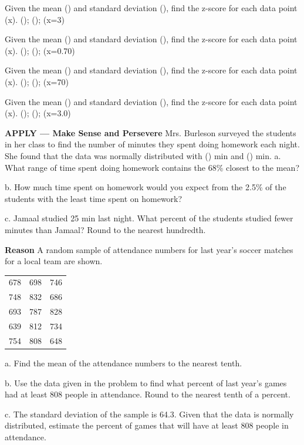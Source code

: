 \documentclass{article}
\newenvironment{practice}[2]{}{}        %
\newcommand{\answer}[1]{}               %
\newcommand{\placeholder}[2]{}          %
\begin{document}
\begin{practice}{25}{1}
Given the mean (\mu) and standard deviation (\sigma), find the z-score for each data point (x).
(); (); (x=3)
\answer{1.5}
\end{practice}
\begin{practice}{26}{1}
Given the mean (\mu) and standard deviation (\sigma), find the z-score for each data point (x).
(); (); (x=0.70)
\answer{−2}
\end{practice}
\begin{practice}{27}{1}
Given the mean (\mu) and standard deviation (\sigma), find the z-score for each data point (x).
(); (); (x=70)
\answer{−2}
\end{practice}
\begin{practice}{28}{1}
Given the mean (\mu) and standard deviation (\sigma), find the z-score for each data point (x).
(); (); (x=3.0)
\answer{0.6}
\end{practice}
\begin{practice}{29}{2}
\textbf{APPLY — Make Sense and Persevere} Mrs. Burleson surveyed the students in her class to find the number of minutes they spent doing homework each night. She found that the data was normally distributed with () min and () min.
a. What range of time spent doing homework contains the 68\% closest to the mean?
\answer{between 20 min and 40 min}
b. How much time spent on homework would you expect from the 2.5\% of the students with the least time spent on homework?
\answer{less than 10 min}
c. Jamaal studied 25 min last night. What percent of the students studied fewer minutes than Jamaal? Round to the nearest hundredth.
\answer{30.85\%}
\end{practice}
\begin{practice}{30}{2}
\textbf{Reason} A random sample of attendance numbers for last year's soccer matches for a local team are shown.
\begin{tabular}{rrr}
678 & 698 & 746 \\
748 & 832 & 686 \\
693 & 787 & 828 \\
639 & 812 & 734 \\
754 & 808 & 648 \\
\end{tabular}
\placeholder{photo}{Crowded soccer stadium with green playing field and spectator stands. Attendance table overlaid at upper left, transcribed in the accompanying tabular.}
a. Find the mean of the attendance numbers to the nearest tenth.
\answer{a. 739.4}
b. Use the data given in the problem to find what percent of last year's games had at least 808 people in attendance. Round to the nearest tenth of a percent.
\answer{b. (\frac{4}{15}) or 26.7\% of the games had at least 808 people in attendance.}
c. The standard deviation of the sample is 64.3. Given that the data is normally distributed, estimate the percent of games that will have at least 808 people in attendance.
\answer{c. z-score: (z=\frac{808-739.4}{64.3}\approx1.067), 14.3\% of games would have had at least 808 people in attendance if the data were normally distributed.}
\end{practice}
\end{document}
